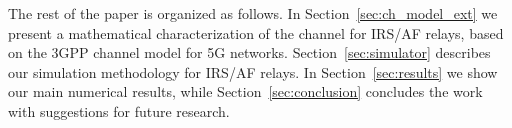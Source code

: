 \def\Var{{\operatorname{Var}}\,}
\def\E{\mathbb{E}\,}

\newcommand{\bigcell}[2]{\begin{tabular}{@{}#1@{}}#2\end{tabular}}

% 
% 

%
%
%
%
%


\def\si{\tikz\fill[scale=0.4](0,.35) -- (.25,0) -- (1,.7) -- (.25,.15) -- cycle;}

    




The rest of the paper is organized as follows. 
In Section~\ref{sec:ch_model_ext} we present a mathematical characterization of the channel for IRS/AF relays, based on the 3GPP channel model for 5G networks.
Section~\ref{sec:simulator} describes our simulation methodology for IRS/AF relays. %
In Section~\ref{sec:results} we show our main numerical results, while Section~\ref{sec:conclusion} concludes the work with suggestions for future research.







